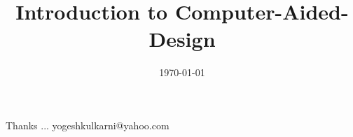 \documentclass[t,pdf]{beamer}
\title[Intro to CAD \hspace{4cm} \insertframenumber /\inserttotalframenumber]{Introduction to Computer-Aided-Design}
\subtitle[]{}
\date[2014]{\today}
\begin{document}
\begin{frame}
\titlepage
\end{frame}







\begin{frame}[c]{}
Thanks ...
\vspace{5mm}
yogeshkulkarni@yahoo.com
\end{frame}


\end{document}
